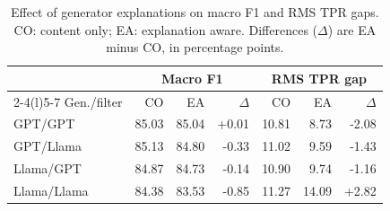 \begin{table}[H]
\centering
\small
\setlength{\tabcolsep}{3pt}
\caption{Effect of generator explanations on macro F1 and RMS TPR gaps. CO: content only; EA: explanation aware. Differences ($\Delta$) are EA minus CO, in percentage points.}
\label{tab:explanation-pairs}
\begin{tabular}{@{}lrrrrrr@{}}
\toprule
 & \multicolumn{3}{c}{Macro F1} & \multicolumn{3}{c}{RMS TPR gap} \\
\cmidrule(lr){2-4}\cmidrule(l){5-7}
Gen./filter & CO & EA & $\Delta$ & CO & EA & $\Delta$ \\
\midrule
GPT/GPT & 85.03 & 85.04 & +0.01 & 10.81 & 8.73 & -2.08 \\
GPT/Llama & 85.13 & 84.80 & -0.33 & 11.02 & 9.59 & -1.43 \\
Llama/GPT & 84.87 & 84.73 & -0.14 & 10.90 & 9.74 & -1.16 \\
Llama/Llama & 84.38 & 83.53 & -0.85 & 11.27 & 14.09 & +2.82 \\
\bottomrule
\end{tabular}
\end{table}
